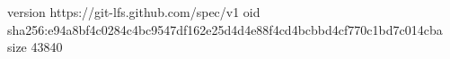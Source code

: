 version https://git-lfs.github.com/spec/v1
oid sha256:e94a8bf4c0284c4bc9547df162e25d4d4e88f4cd4bcbbd4cf770c1bd7c014cba
size 43840

